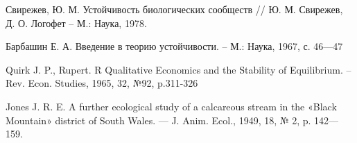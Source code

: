 \renewcommand{\refname}{\centering Список литературы}
\begin{thebibliography}{1}

        Свирежев, Ю. М. Устойчивость биологических сообществ // Ю. М. Свирежев, Д. О. Логофет -- М.: Наука, 1978.

        Барбашин Е. А. Введение в теорию устойчивости. -- М.: Наука, 1967, с. 46—47


    
        Quirk J. P., Rupert. R Qualitative Economics and the Stability of Equilibrium. -- Rev. Econ. Studies, 1965, 32, №92, p.311-326

        Jones J. R. E. A further ecological study of a calcareous stream in the «Black Mountain» district of South Wales. — J. Anim. Ecol., 1949, 18, № 2, p. 142—159.


\end{thebibliography}
